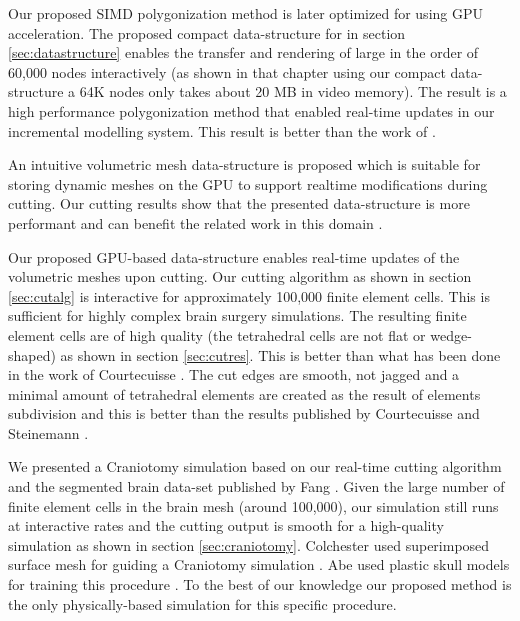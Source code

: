 Our proposed SIMD polygonization method is later optimized for using GPU acceleration. The 
proposed compact data-structure for \blob in section \ref{sec:datastructure} enables the transfer and 
rendering of large \blob in the order of 60,000 nodes interactively (as shown in that chapter using our 
compact data-structure a 64K nodes \blob only takes about 20 MB in video memory).  The result is a 
high performance polygonization method that enabled real-time updates in our incremental modelling 
system. This result is better than the work of \cite{Knoll2007, Yang2010, singh2010real, chochlik2012gpu}.
 
An intuitive volumetric mesh data-structure is proposed which is suitable for storing dynamic meshes on 
the GPU to support realtime modifications during cutting. Our cutting results show that the presented 
data-structure is more performant and can benefit the related work in this domain 
\cite{Wu2004a, Wu2005, Courtecuisse2010}.

Our proposed GPU-based data-structure enables real-time updates of the volumetric meshes upon 
cutting. Our cutting algorithm as shown in section \ref{sec:cutalg} is interactive for approximately 100,000 finite 
element cells. This is sufficient for highly complex brain surgery simulations. The resulting finite element 
cells are of high quality (the tetrahedral cells are not flat or wedge-shaped) as shown in section \ref{sec:cutres}. 
This is better than what has been done in the work of Courtecuisse \etal \cite{Courtecuisse2010}.
The cut edges are smooth, not jagged and a minimal amount of tetrahedral elements are 
created as the result of elements subdivision and this is better than the results published by Courtecuisse
\etal and Steinemann \etal \cite{Courtecuisse2010, Steinemann}. 


We presented a Craniotomy simulation based on our real-time cutting algorithm and the segmented 
brain data-set published by Fang \etal \cite{fang2010mesh}. 
Given the large number of finite element cells in the brain mesh (around 100,000), our 
simulation still runs at interactive rates and the cutting output is smooth for a high-quality simulation 
as shown in section \ref{sec:craniotomy}. Colchester \etal used superimposed surface mesh for 
guiding a Craniotomy simulation \cite{Colchester1994}. Abe \etal used plastic skull models for 
training this procedure \cite{Abe1998}. To the best of our knowledge our proposed method is the only 
physically-based simulation for this specific procedure. 




